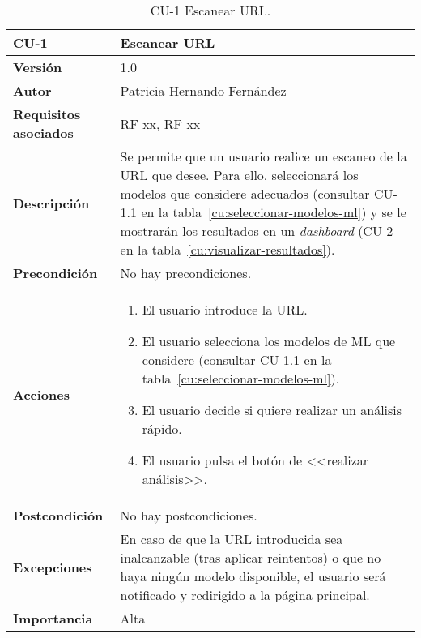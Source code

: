\begin{table}[p]
	\centering
	\begin{tabularx}{\linewidth}{ p{} p{} }
		\toprule
		\textbf{CU-1}    & \textbf{Escanear URL}\\
		\toprule
		\textbf{Versión}              & 1.0    \\
		\textbf{Autor}                & Patricia Hernando Fernández \\
		\textbf{Requisitos asociados} & RF-xx, RF-xx \\
		\textbf{Descripción}          & Se permite que un usuario realice un escaneo de la URL que desee. Para ello, seleccionará los modelos que considere adecuados (consultar CU-1.1 en la tabla~\ref{cu:seleccionar-modelos-ml}) y se le mostrarán los resultados en un \textit{dashboard} (CU-2 en la tabla~\ref{cu:visualizar-resultados}). \\
		\textbf{Precondición}         & No hay precondiciones. \\
		\textbf{Acciones}             &
		\begin{enumerate}
			\def\labelenumi{\arabic{enumi}.}
			\tightlist
			\item El usuario introduce la URL.
			\item El usuario selecciona los modelos de ML que considere (consultar CU-1.1 en la tabla~\ref{cu:seleccionar-modelos-ml}).
			\item El usuario decide si quiere realizar un análisis rápido.
			\item El usuario pulsa el botón de <<realizar análisis>>.
		\end{enumerate}\\
		\textbf{Postcondición}        & No hay postcondiciones. \\
		\textbf{Excepciones}          & En caso de que la URL introducida sea inalcanzable (tras aplicar reintentos) o que no haya ningún modelo disponible, el usuario será notificado y redirigido a la página principal. \\
		\textbf{Importancia}          & Alta \\
		\bottomrule
	\end{tabularx}
	\caption{CU-1 Escanear URL.}
	\label{cu:escanear-url}
\end{table}


